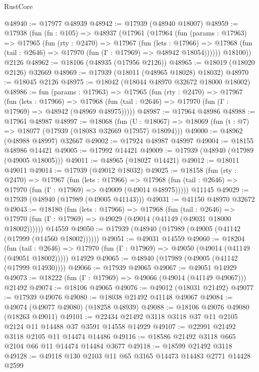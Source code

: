 \begin{lexlean}{RustCore}
\begin{coremodule}
@48940 := @17977 @48939
@48942 := @17939 (@48940 @18007)
@48959 := @17938
    (fun (fn : @105) =>
    @48937
      (@17961
        (@17964
          (fun (params : @17963) =>
          @17965
            (fun (rty : @2470) =>
            @17967
              (fun (lets : @17966) =>
              @17968 (fun (tail : @2646) => @17970 (fun (Γ : @17969) => @48942 @18054))))))
        @18100))
    @2126
@48962 := @18106 (@48935 (@17956 @2126))
@48965 := @18019 (@18020 @2126) @32669
@48969 := @17939 (@18011 (@48965 @18028) @18032)
@48970 := @18045 @2126
@48975 := @18042 (@18044 @48970 @32672 @18000 @18002)
@48986 := fun (params : @17963) =>
  @17965
    (fun (rty : @2470) =>
    @17967
      (fun (lets : @17966) =>
      @17968 (fun (tail : @2646) => @17970 (fun (Γ : @17969) => @48942 (@48969 @48975)))))
@48987 := @17964 @48986
@48988 := @17961 @48987
@48997 := @18068
    (fun (U : @18067) => @18069 (fun (t : @7) => @18077 (@17939 (@18083 @32669 @17957) @18094)))
@49000 := @48962 (@48988 @48997) @32667
@49002 := @17924 @48987 @48997
@49004 := @18155 @48986 @14421
@49005 := @17992 @14421
@49009 := @17939 (@48940 (@17989 (@49005 @18005)))
@49011 := @48965 (@18027 @14421)
@49012 := @18011 @49011
@49014 := @17939 (@49012 @18032)
@49025 := @18158
    (fun (rty : @2470) =>
    @17967
      (fun (lets : @17966) =>
      @17968 (fun (tail : @2646) => @17970 (fun (Γ : @17969) => @49009 (@49014 @48975)))))
    @11145
@49029 := @17939 (@48940 (@17989 (@49005 @41143)))
@49031 := @41150 @48970 @32672
@49043 := @18180
    (fun (lets : @17966) =>
    @17968
      (fun (tail : @2646) =>
      @17970 (fun (Γ : @17969) => @49029 (@49014 (@41149 (@49031 @18000 @18002))))))
    @14559
@49050 := @17939 (@48940 (@17989 (@49005 (@41142 (@17999 (@14560 @18002))))))
@49051 := @49031 @14559
@49060 := @18204
    (fun (tail : @2646) => @17970 (fun (Γ : @17969) => @49050 (@49014 (@41149 (@49051 @18002)))))
    @14929
@49065 := @48940 (@17989 (@49005 (@41142 (@17999 @14930))))
@49066 := @17939 @49065
@49067 := @49051 @14929
@49073 := @18222 (fun (Γ : @17969) => @49066 (@49014 (@41149 @49067))) @21492
@49074 := @18106 @49065
@49076 := @49012 (@18031 @21492)
@49077 := @17939 @49076
@49080 := @18038 @21492 @41148 @49067
@49084 := @49074 (@49077 @49080) (@18258 @48939)
@49088 := @18106 @49076 @49080 (@18263 @49011)
@49101 := @22434 @21492 @3118 @3118 @37 @11 @2105 @2124 @11 @14488 @37 @3591 @14558 @14929
@49107 := @22991 @21492 @3118 @2105 @11 @14474 @14486
@49116 := @18586 @21492 @3118 @665 @2104 @66 @11 @14474 @14484 @3677
@49118 := @18599 @21492 @3118
@49128 := @49118 @130 @2103 @11 @65 @3165 @14473 @14483 @2771 @14428 @2599

\end{coremodule}
\end{lexlean}
